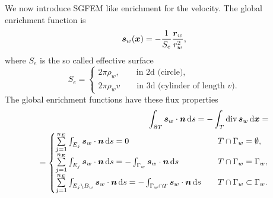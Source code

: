 We now introduce SGFEM like enrichment for the velocity.
The global enrichment function is
\begin{equation}
    \mathbf{\boldsymbol{s}}_w(\mathbf{\boldsymbol{x}}) = -\frac{1}{S_e} \frac{\mathbf{\boldsymbol{r}}_w}{r_w^2} \label{eqn:global_enr_vel},
\end{equation}
where $S_e$ is the so called effective surface
\[
S_e = \begin{cases}2\pi\rho_w, \qquad \textrm{in 2d (circle)}, \\ 2\pi\rho_w v \qquad \textrm{in 3d (cylinder of length }v).\end{cases}
\]
The global enrichment functions have these flux properties
\begin{align}
    \int_{\partial T} \mathbf{\boldsymbol{s}}_w\cdot\mathbf{\boldsymbol{n}} \,\mathrm{d} s = - \int_T {\rm div}\,\mathbf{\boldsymbol{s}}_w \,\mathrm{d}\mathbf{\boldsymbol{x}} = \nonumber\\
    = \begin{cases}
        \sum \limits_{j=1}^{n_E} \int_{E_j} \mathbf{\boldsymbol{s}}_w\cdot\mathbf{\boldsymbol{n}} \,\mathrm{d} s = 0
            & \quad T \cap \Gamma_w=\emptyset, \\
        \sum \limits_{j=1}^{n_E} \int_{E_j} \mathbf{\boldsymbol{s}}_w\cdot\mathbf{\boldsymbol{n}} \,\mathrm{d} s = 
            - \int_{\Gamma_w} \mathbf{\boldsymbol{s}}_w\cdot\mathbf{\boldsymbol{n}} \,\mathrm{d} s
            &\quad T \cap \Gamma_w=\Gamma_w, \\
        \sum \limits_{j=1}^{n_E} \int_{E_j\setminus B_w} \mathbf{\boldsymbol{s}}_w\cdot\mathbf{\boldsymbol{n}} \,\mathrm{d} s 
        = - \int_{\Gamma_w\cap T} \mathbf{\boldsymbol{s}}_w\cdot\mathbf{\boldsymbol{n}} \,\mathrm{d} s &\quad T \cap \Gamma_w\subset\Gamma_w. \\
    \end{cases}
\end{align}

